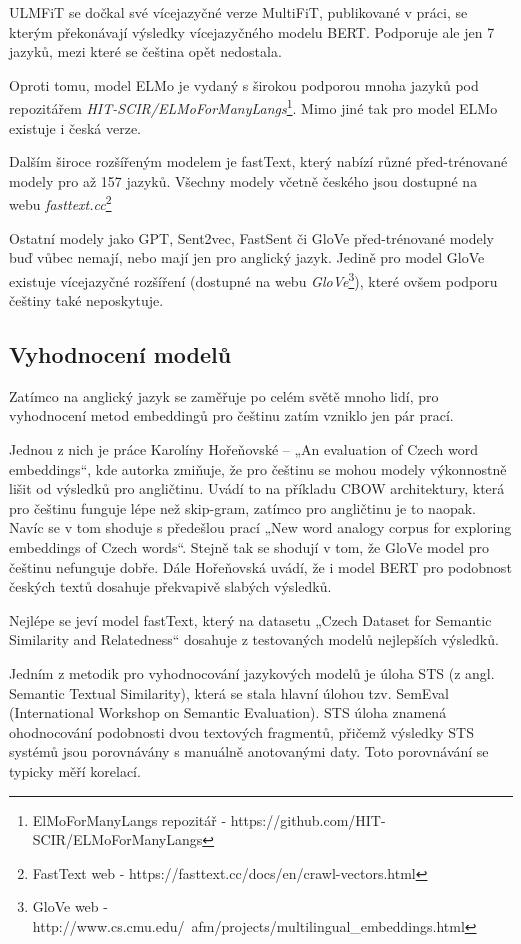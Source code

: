 \documentclass[thesis=M,czech]{FITthesis}[2019/12/23]
\begin{document}
ULMFiT se dočkal své vícejazyčné verze MultiFiT, publikované v práci\cite{eisenschlos2019}, se kterým překonávají výsledky vícejazyčného modelu BERT. Podporuje ale jen 7 jazyků, mezi které se čeština opět nedostala.

Oproti tomu, model ELMo je vydaný s širokou podporou mnoha jazyků pod repozitářem \textit{HIT-SCIR/ELMoForManyLangs}\footnote{ElMoForManyLangs repozitář - https://github.com/HIT-SCIR/ELMoForManyLangs}. Mimo jiné tak pro model ELMo existuje i česká verze.

Dalším široce rozšířeným modelem je fastText, který nabízí různé před-trénované modely pro až 157 jazyků. Všechny modely včetně českého jsou dostupné na webu \textit{fasttext.cc}\footnote{FastText web - https://fasttext.cc/docs/en/crawl-vectors.html}

Ostatní modely jako GPT, Sent2vec, FastSent či GloVe před-trénované modely buď vůbec nemají, nebo mají jen pro anglický jazyk. Jedině pro model GloVe existuje vícejazyčné rozšíření (dostupné na webu \textit{GloVe}\footnote{GloVe web - http://www.cs.cmu.edu/~afm/projects/multilingual\_embeddings.html}), které ovšem podporu češtiny také neposkytuje.

\subsection{Vyhodnocení modelů}
\label{sec:model_evaluation}
Zatímco na anglický jazyk se zaměřuje po celém světě mnoho lidí, pro vyhodnocení metod embeddingů pro češtinu zatím vzniklo jen pár prací.

Jednou z nich je práce Karolíny Hořeňovské -- „An evaluation of Czech word embeddings“\cite{horenovska2019}, kde autorka zmiňuje, že pro češtinu se mohou modely výkonnostně lišit od výsledků pro angličtinu. Uvádí to na příkladu CBOW architektury, která pro češtinu funguje lépe než skip-gram, zatímco pro angličtinu je to naopak. Navíc se v tom shoduje s předešlou prací „New word analogy corpus for exploring  embeddings  of Czech words“\cite{svoboda2016}. Stejně tak se shodují v tom, že GloVe model pro češtinu nefunguje dobře. Dále Hořeňovská uvádí, že i model BERT pro podobnost českých textů dosahuje překvapivě slabých výsledků.

Nejlépe se jeví model fastText, který na datasetu „Czech Dataset for Semantic Similarity and Relatedness“\cite{konopik2017} dosahuje z testovaných modelů nejlepších výsledků.

Jedním z metodik pro vyhodnocování jazykových modelů je úloha STS (z angl. Semantic Textual Similarity), která se stala hlavní úlohou tzv. SemEval (International Workshop on Semantic Evaluation). STS úloha znamená ohodnocování podobnosti dvou textových fragmentů, přičemž výsledky STS systémů jsou porovnávány s manuálně anotovanými daty. Toto porovnávání se typicky měří korelací.
\end{document}
